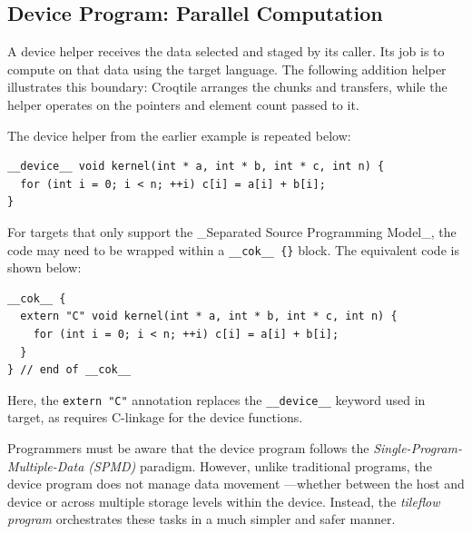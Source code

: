 \subsection*{Device Program: Parallel Computation}

A device helper receives the data selected and staged by its caller. Its job is to compute on that data using the target language. The following addition helper illustrates this boundary: Croqtile arranges the chunks and transfers, while the helper operates on the pointers and element count passed to it.

The device helper from the earlier example is repeated below:

\begin{lstlisting}[language=croqtile,caption={A device helper called from tileflow}]
__device__ void kernel(int * a, int * b, int * c, int n) {
  for (int i = 0; i < n; ++i) c[i] = a[i] + b[i];
}
\end{lstlisting}

For targets that only support the \_Separated Source Programming Model\_, the code may need to be wrapped within a \texttt{\_\allowbreak{}\_\allowbreak{}cok\_\allowbreak{}\_\allowbreak{} \{\}} block. The equivalent  code is shown below:

\begin{lstlisting}[language=croqtile,caption={The cok wrapper for separate sources}]
__cok__ {
  extern "C" void kernel(int * a, int * b, int * c, int n) {
    for (int i = 0; i < n; ++i) c[i] = a[i] + b[i];
  }
} // end of __cok__
\end{lstlisting}

Here, the \texttt{extern "C"} annotation replaces the \texttt{\_\_device\_\_} keyword used in  target, as  requires C-linkage for the device functions.

Programmers must be aware that the device program follows the \emph{Single-Program-Multiple-Data (SPMD)} paradigm. However, unlike traditional  programs, the device program does not manage data movement ---whether between the host and device or across multiple storage levels within the device. Instead, the \emph{tileflow program} orchestrates these tasks in a much simpler and safer manner.
